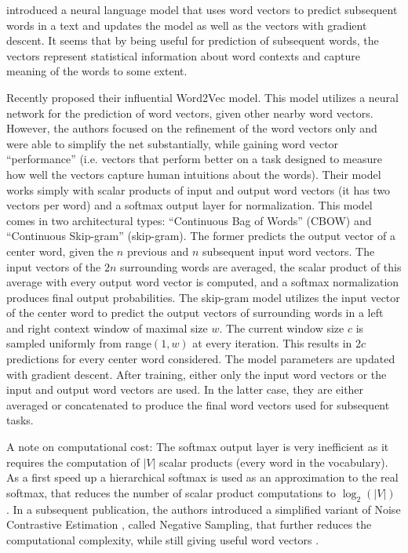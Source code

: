 \citet{Bengio2003} introduced a neural language model that uses
word vectors to predict subsequent words in a text and updates the
model as well as the vectors with gradient descent. It seems that
by being useful for prediction of subsequent words, the vectors represent
statistical information about word contexts and capture meaning of
the words to some extent.

Recently \citet{Mikolov2013a} proposed their influential Word2Vec model.
This model utilizes a neural network for the prediction of word vectors,
given other nearby word vectors. However, the authors focused on the
refinement of the word vectors only and were able to simplify the
net substantially, while gaining word vector ``performance'' (i.e.
vectors that perform better on a task designed to measure how well
the vectors capture human intuitions about the words). Their model
works simply with scalar products of input and output word vectors
(it has two vectors per word) and a softmax output layer for normalization.
This model comes in two architectural types: ``Continuous Bag of Words''
(CBOW) and ``Continuous Skip-gram'' (skip-gram). The former predicts
the output vector of a center word, given the $n$ previous and
$n$ subsequent input word vectors. The input vectors of the $2n$
surrounding words are averaged, the scalar product of this average
with every output word vector is computed, and a softmax normalization
produces final output probabilities. The skip-gram model utilizes
the input vector of the center word to predict the output vectors
of surrounding words in a left and right context window of maximal
size $w$. The current window size $c$ is sampled uniformly from
range$(1,w)$ at every iteration. This results in $2c$ predictions
for every center word considered. The model parameters are updated
with gradient descent. After training, either only the input word vectors
or the input and output word vectors are used. In the latter case, they are either averaged
or concatenated to produce the final word vectors used for subsequent
tasks. 

A note on computational cost: The softmax output layer is very inefficient
as it requires the computation of $|V|$ scalar products (every word
in the vocabulary). As a first speed up a hierarchical softmax \citep{Morin2005} is
used as an approximation to the real softmax, that reduces the number
of scalar product computations to $\log_{2}(|V|)$ \citep{Mikolov2013a}.
In a subsequent publication, the authors introduced a
simplified variant of Noise Contrastive Estimation \citep{Gutmann2012}, called
Negative Sampling, that further reduces the computational complexity,
while still giving useful word vectors \citep{Mikolov2013b}. 

